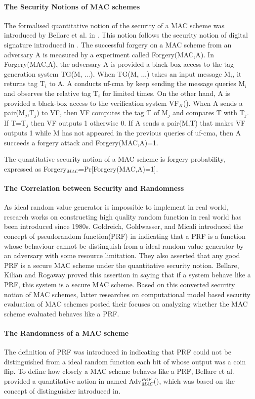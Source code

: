 \documentclass{article}
\begin{document}
\paragraph{The Security Notions of MAC schemes}
The formalised quantitative notion of the security of a MAC scheme was introduced by Bellare et al. in \cite{cbc1994}. This notion follows the security notion of digital signature introduced in \cite{signature}. The successful forgery on a MAC scheme from an adversary A is measured by a experiment called Forgery(MAC,A). In Forgery(MAC,A),  
the adversary A is provided a black-box access to the tag generation system
TG(M, $\ldots$). When TG(M, $\ldots$) takes an input message M$_i$, it returns
tag T$_i$ to A. A conducts uf-cma by keep sending the message queries M$_i$ and
observes the relative tag T$_i$ for limited times. On the other hand, A is
provided a black-box access to the verification system VF$_K$(). When A sends a
pair(M$_j$,T$_j$) to VF, then VF computes the tag
T of M$_j$ and compares T with T$_j$. If T=T$_j$ then VF outputs 1 otherwise 0. If A sends a pair(M,T) that makes VF outputs 1 while M has not appeared in the previous queries of uf-cma, then A succeeds a forgery attack and Forgery(MAC,A)=1.

The quantitative security notion of a MAC scheme is forgery probability, expressed as Forgery$_{MAC}$=Pr[Forgery(MAC,A)=1].
\paragraph{The Correlation between Security and Randomness}
As ideal random value generator is impossible to implement in real world, research works on constructing high quality random function in real world has been introduced since 1980s. Goldreich, Goldwasser, and Micali introduced the concept of pseudorandom function(PRF) in \cite{prf} indicating that a PRF is a function whose behaviour cannot be distinguish from a ideal random value generator by an adversary with some resource limitation. They also asserted that any good
PRF is a secure MAC scheme under the quantitative
security notion. Bellare, Kilian and Rogaway proved this assertion in
\cite{cbc1994} saying that if a system behave like a PRF, this
system is a secure MAC scheme. Based on this converted security notion of MAC schemes, latter researches
on computational model based security evaluation of MAC schemes posted their focuses on analyzing whether the MAC scheme evaluated behaves like a PRF.
\paragraph{The Randomness of a MAC scheme}
The definition of PRF was introduced in \cite{prf} indicating that PRF could not be distinguished from a ideal random function each bit of whose output was a coin flip. To define how closely a MAC scheme behaves like a PRF, Bellare et al. provided a quantitative notion in \cite{cbc1994} named Adv$^{PRF}_{MAC}$(), which was based on the concept of distinguisher introduced in\cite{prf}. 
\end{document}
